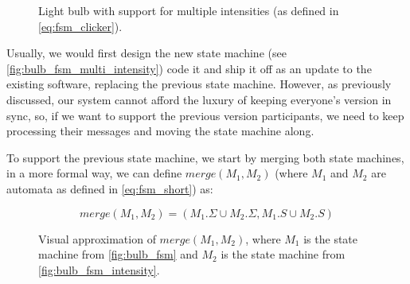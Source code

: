 \documentclass[a4paper]{article}
\begin{document}
\begin{figure}[ht]
    \centering
    \caption{Light bulb with support for multiple intensities (as defined in \autoref{eq:fsm_clicker}).}
    \label{fig:bulb_fsm_multi_intensity}
\end{figure}

Usually, we would first design the new state machine (see \autoref{fig:bulb_fsm_multi_intensity})
code it and ship it off as an update to the existing software, replacing the previous state machine.
However, as previously discussed, our system cannot afford the luxury of keeping everyone's version in sync,
so, if we want to support the previous version participants,
we need to keep processing their messages and moving the state machine along.

To support the previous state machine, we start by merging both state machines,
in a more formal way, we can define $merge(M_1, M_2)$
(where $M_1$ and $M_2$ are automata as defined in \autoref{eq:fsm_short}) as:

\begin{equation}
    merge(M_1, M_2) = (M_1.\Sigma \cup M_2.\Sigma, M_1.S \cup M_2.S)
    \label{eq:fsm_merge}
\end{equation}

\begin{figure}[ht]
    \centering
    \caption{
        Visual approximation of $merge(M_1, M_2)$,
        where $M_1$ is the state machine from \autoref{fig:bulb_fsm} and
        $M_2$ is the state machine from \autoref{fig:bulb_fsm_intensity}.}
    \label{fig:bulb_fsm_merge}
\end{figure}
\end{document}
